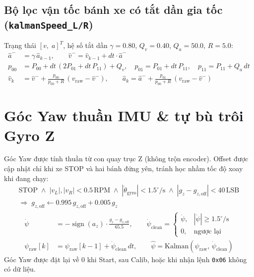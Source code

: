 \documentclass[10pt,a4paper]{article}
\begin{document}
\subsection{Bộ lọc vận tốc bánh xe có tắt dần gia tốc (\texttt{kalmanSpeed\_L/R})}
Trạng thái $[v,\; a]^T$, hệ số tắt dần $\gamma = 0.80$, $Q_v = 0.40$, $Q_a = 50.0$, $R = 5.0$:
\begin{align}
\hat{a}^- &= \gamma\, \hat{a}_{k-1}, \qquad \hat{v}^- = \hat{v}_{k-1} + dt \cdot \hat{a}^- \\
p_{00} &= P_{00} + dt\,(2P_{01} + dt\,P_{11}) + Q_v, \quad p_{01} = P_{01} + dt\,P_{11}, \quad p_{11} = P_{11} + Q_a\,dt \\
\hat{v}_k &= \hat{v}^- + \frac{p_{00}}{p_{00} + R}\,(v_{\text{raw}} - \hat{v}^-), \qquad \hat{a}_k = \hat{a}^- + \frac{p_{01}}{p_{00} + R}\,(v_{\text{raw}} - \hat{v}^-)
\end{align}

\section{Góc Yaw thuần IMU \& tự bù trôi Gyro Z}\label{sec:yaw}
Góc Yaw được tính thuần từ con quay trục Z (không trộn encoder). Offset được cập nhật chỉ khi xe STOP và hai bánh đứng yên, tránh học nhầm tốc độ xoay khi đang chạy:
\begin{multline}
\text{STOP} \;\wedge\; |v_L|, |v_R| < 0.5\,\text{RPM} \;\wedge\; |\dot{\theta}_{\text{gyro}}| < 1.5^\circ/\text{s} \;\wedge\; |g_z - g_{z,\text{off}}| < 40\,\text{LSB} \\
\Rightarrow\; g_{z,\text{off}} \leftarrow 0.995\, g_{z,\text{off}} + 0.005\, g_z
\end{multline}
\begin{align}
\dot{\psi} &= -\operatorname{sign}(a_z) \cdot \frac{g_z - g_{z,\text{off}}}{65.5}, \qquad
\dot{\psi}_{\text{clean}} = \begin{cases} \dot{\psi}, & |\dot{\psi}| \ge 1.5^\circ/\text{s} \\ 0, & \text{ngược lại} \end{cases} \\
\psi_{\text{raw}}[k] &= \psi_{\text{raw}}[k-1] + \dot{\psi}_{\text{clean}}\, dt, \qquad \hat{\psi} = \text{Kalman}(\psi_{\text{raw}},\, \dot{\psi}_{\text{clean}})
\end{align}
Góc Yaw được đặt lại về 0 khi Start, sau Calib, hoặc khi nhận lệnh \texttt{0x06} không có dữ liệu.
\end{document}
